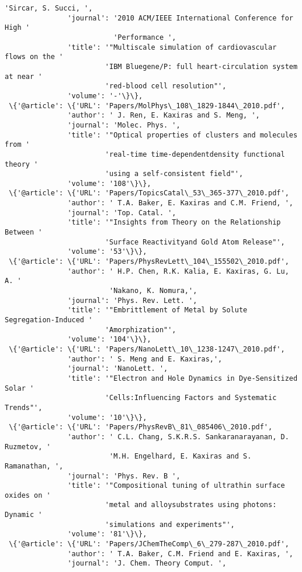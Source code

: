 \documentclass[11pt]{article}
\begin{document}
\begin{Verbatim}[commandchars=\\\{\}]
                         'Sircar, S. Succi, ',
               'journal': '2010 ACM/IEEE International Conference for High '
                          'Performance ',
               'title': '"Multiscale simulation of cardiovascular flows on the '
                        'IBM Bluegene/P: full heart-circulation system at near '
                        'red-blood cell resolution"',
               'volume': '-'\}\},
 \{'@article': \{'URL': 'Papers/MolPhys\_108\_1829-1844\_2010.pdf',
               'author': ' J. Ren, E. Kaxiras and S. Meng, ',
               'journal': 'Molec. Phys. ',
               'title': '"Optical properties of clusters and molecules from '
                        'real-time time-dependentdensity functional theory '
                        'using a self-consistent field"',
               'volume': '108'\}\},
 \{'@article': \{'URL': 'Papers/TopicsCatal\_53\_365-377\_2010.pdf',
               'author': ' T.A. Baker, E. Kaxiras and C.M. Friend, ',
               'journal': 'Top. Catal. ',
               'title': '"Insights from Theory on the Relationship Between '
                        'Surface Reactivityand Gold Atom Release"',
               'volume': '53'\}\},
 \{'@article': \{'URL': 'Papers/PhysRevLett\_104\_155502\_2010.pdf',
               'author': ' H.P. Chen, R.K. Kalia, E. Kaxiras, G. Lu, A. '
                         'Nakano, K. Nomura,',
               'journal': 'Phys. Rev. Lett. ',
               'title': '"Embrittlement of Metal by Solute Segregation-Induced '
                        'Amorphization"',
               'volume': '104'\}\},
 \{'@article': \{'URL': 'Papers/NanoLett\_10\_1238-1247\_2010.pdf',
               'author': ' S. Meng and E. Kaxiras,',
               'journal': 'NanoLett. ',
               'title': '"Electron and Hole Dynamics in Dye-Sensitized Solar '
                        'Cells:Influencing Factors and Systematic Trends"',
               'volume': '10'\}\},
 \{'@article': \{'URL': 'Papers/PhysRevB\_81\_085406\_2010.pdf',
               'author': ' C.L. Chang, S.K.R.S. Sankaranarayanan, D. Ruzmetov, '
                         'M.H. Engelhard, E. Kaxiras and S. Ramanathan, ',
               'journal': 'Phys. Rev. B ',
               'title': '"Compositional tuning of ultrathin surface oxides on '
                        'metal and alloysubstrates using photons: Dynamic '
                        'simulations and experiments"',
               'volume': '81'\}\},
 \{'@article': \{'URL': 'Papers/JChemTheComp\_6\_279-287\_2010.pdf',
               'author': ' T.A. Baker, C.M. Friend and E. Kaxiras, ',
               'journal': 'J. Chem. Theory Comput. ',

\end{Verbatim}
\end{document}
